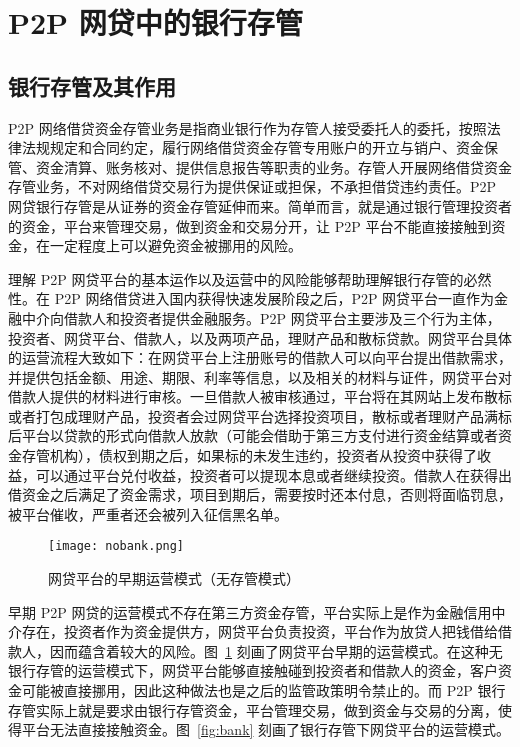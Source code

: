 \documentclass[lang=cn,11pt]{elegantpaper}
\begin{document}
\section{P2P 网贷中的银行存管}

\subsection{银行存管及其作用}

P2P 网络借贷资金存管业务是指商业银行作为存管人接受委托人的委托，按照法律法规规定和合同约定，履行网络借贷资金存管专用账户的开立与销户、资金保管、资金清算、账务核对、提供信息报告等职责的业务。存管人开展网络借贷资金存管业务，不对网络借贷交易行为提供保证或担保，不承担借贷违约责任。P2P 网贷银行存管是从证券的资金存管延伸而来。简单而言，就是通过银行管理投资者的资金，平台来管理交易，做到资金和交易分开，让 P2P 平台不能直接接触到资金，在一定程度上可以避免资金被挪用的风险。
 
理解 P2P 网贷平台的基本运作以及运营中的风险能够帮助理解银行存管的必然性。在 P2P 网络借贷进入国内获得快速发展阶段之后，P2P 网贷平台一直作为金融中介向借款人和投资者提供金融服务。P2P 网贷平台主要涉及三个行为主体，投资者、网贷平台、借款人，以及两项产品，理财产品和散标贷款。网贷平台具体的运营流程大致如下：在网贷平台上注册账号的借款人可以向平台提出借款需求，并提供包括金额、用途、期限、利率等信息，以及相关的材料与证件，网贷平台对借款人提供的材料进行审核。一旦借款人被审核通过，平台将在其网站上发布散标或者打包成理财产品，投资者会过网贷平台选择投资项目，散标或者理财产品满标后平台以贷款的形式向借款人放款（可能会借助于第三方支付进行资金结算或者资金存管机构），债权到期之后，如果标的未发生违约，投资者从投资中获得了收益，可以通过平台兑付收益，投资者可以提现本息或者继续投资。借款人在获得出借资金之后满足了资金需求，项目到期后，需要按时还本付息，否则将面临罚息，被平台催收，严重者还会被列入征信黑名单。

\begin{figure}
\centering
\texttt{[image: nobank.png]}
\caption{ 网贷平台的早期运营模式（无存管模式）\label{fig:nobank}}
\end{figure}

早期 P2P 网贷的运营模式不存在第三方资金存管，平台实际上是作为金融信用中介存在，投资者作为资金提供方，网贷平台负责投资，平台作为放贷人把钱借给借款人，因而蕴含着较大的风险。图~\ref{fig:nobank} 刻画了网贷平台早期的运营模式。在这种无银行存管的运营模式下，网贷平台能够直接触碰到投资者和借款人的资金，客户资金可能被直接挪用，因此这种做法也是之后的监管政策明令禁止的。而 P2P 银行存管实际上就是要求由银行存管资金，平台管理交易，做到资金与交易的分离，使得平台无法直接接触资金。图~\ref{fig:bank} 刻画了银行存管下网贷平台的运营模式。
\end{document}
